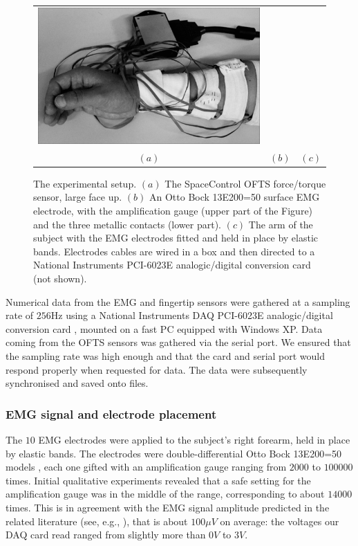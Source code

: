 \begin{figure}[!ht]
\begin{tabular}{ccc}
    \includegraphics[height=0.16\textheight]{figs/setup} \\
    $(a)$ & $(b)$ & $(c)$ \\
  \end{tabular}
  \caption{The experimental setup. $(a)$ The SpaceControl OFTS
    force/torque sensor, large face up. $(b)$ An Otto Bock 13E200=50
    surface EMG electrode, with the amplification gauge (upper part of
    the Figure) and the three metallic contacts (lower part). $(c)$
    The arm of the subject with the EMG electrodes fitted and held in
    place by elastic bands. Electrodes cables are wired in a box and
    then directed to a National Instruments PCI-6023E analogic/digital
    conversion card (not shown).}
  \label{fig:setup}
\end{figure}

Numerical data from the EMG and fingertip sensors were gathered at a
sampling rate of $256$Hz using a National Instruments DAQ PCI-6023E
analogic/digital conversion card \cite{...}, mounted on a fast PC
equipped with Windows XP. Data coming from the OFTS sensors was
gathered via the serial port. We ensured that the sampling rate was
high enough and that the card and serial port would respond properly
when requested for data. The data were subsequently synchronised and
saved onto files.

\subsubsection{EMG signal and electrode placement}

The $10$ EMG electrodes were applied to the subject's right forearm,
held in place by elastic bands. The electrodes were
double-differential Otto Bock 13E200=50 models \cite{...}, each one
gifted with an amplification gauge ranging from $2000$ to $100000$
times. Initial qualitative experiments revealed that a safe setting
for the amplification gauge was in the middle of the range,
corresponding to about $14000$ times. This is in agreement with the
EMG signal amplitude predicted in the related literature (see, e.g.,
\cite{deluca}), that is about $100 \mu V$ on average: the voltages our
DAQ card read ranged from slightly more than $0V$ to $3V$.

